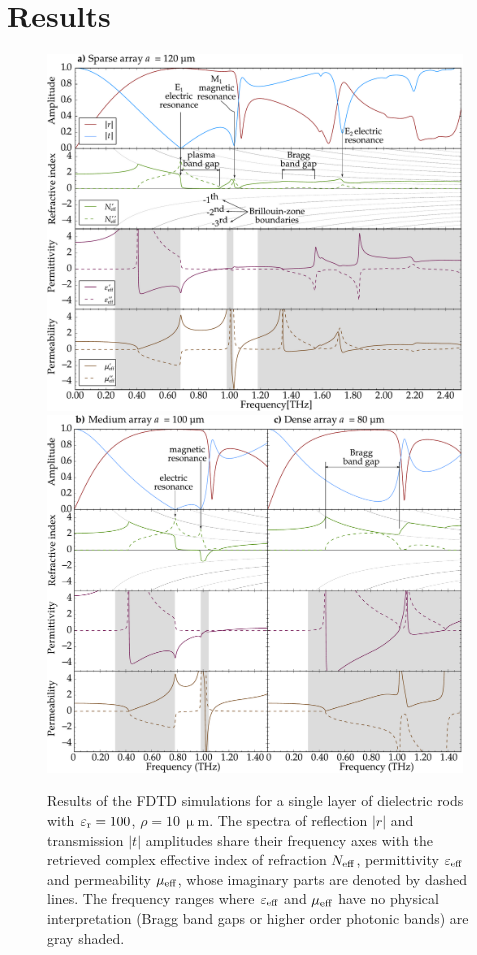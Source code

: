 \documentclass[letterpaper,12pt]{report}
\begin{document}
\section{Results}
\begin{figure}[h!]
\centering\includegraphics[width=11cm]{img/ERods_eps100_single_a120_FDTD.pdf}
\centering\includegraphics[width=11cm]{img/ERods_eps100_double_a100a080_FDTD.pdf}
\caption{Results of the FDTD simulations for a single layer of dielectric rods with $\varepsilon_{\rm r}= 100$,
$\rho=10$\,$\upmu$m. The spectra of reflection $|r|$ and transmission $|t|$ amplitudes share
their frequency axes with the retrieved complex effective index of refraction $N_{\text{eff} }$,
permittivity $\varepsilon_{\text{eff} }$ and permeability $\mu_{\text{eff} }$, whose imaginary parts are denoted by
dashed lines. The frequency ranges where $\varepsilon_{\text{eff} }$ and $\mu_{\text{eff} }$ have no physical
interpretation (Bragg band gaps or higher order photonic bands) are gray shaded.  } \label{fg_spec}
\end{figure}
\end{document}
